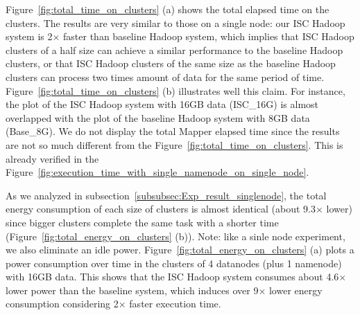 Figure~\ref{fig:total_time_on_clusters} (a) shows the total elapsed time on the clusters. The results are very similar to those on a single node: our ISC Hadoop system is 2$\times$ faster than baseline Hadoop system, which implies that ISC Hadoop clusters of a half size can achieve a similar performance to the baseline Hadoop clusters, or that ISC Hadoop clusters of the same size as the baseline Hadoop clusters can process two times amount of data for the same period of time. Figure~\ref{fig:total_time_on_clusters} (b) illustrates well this claim. For instance, the plot of the ISC Hadoop system with 16GB data (ISC\_16G) is almost overlapped with the plot of the baseline Hadoop system with 8GB data (Base\_8G).
We do not display the total Mapper elapsed time since the results are not so much different from the Figure~\ref{fig:total_time_on_clusters}. This is already verified in the Figure~\ref{fig:execution_time_with_single_namenode_on_single_node}.
 
As we analyzed in subsection~\ref{subsubsec:Exp_result_singlenode}, the total energy consumption of each size of clusters is almost identical (about 9.3$\times$ lower) since bigger clusters complete the same task with a shorter time (Figure~\ref{fig:total_energy_on_clusters} (b)). Note: like a sinle node experiment, we also eliminate an idle power. Figure~\ref{fig:total_energy_on_clusters} (a) plots a power consumption over time in the clusters of 4 datanodes (plus 1 namenode) with 16GB data. This shows that the ISC Hadoop system consumes about 4.6$\times$ lower power than the baseline system, which induces over 9$\times$ lower energy consumption considering 2$\times$ faster execution time.












